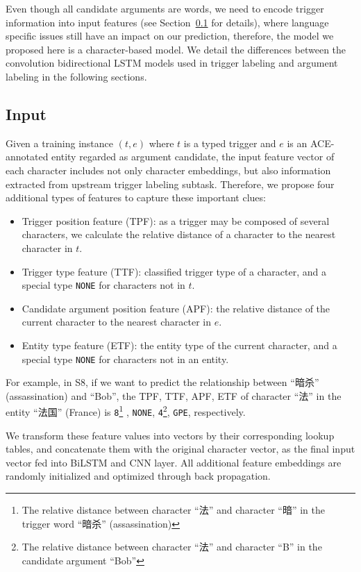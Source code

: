 Even though all candidate arguments are words, we need to encode trigger information into input features (see Section~\ref{ainput} for details), where language specific issues still have an impact on our prediction, therefore, the model we proposed here is a character-based model. We detail the differences between the convolution bidirectional LSTM models used in trigger labeling and argument labeling in the following sections.

\subsection{Input}\label{ainput}
Given a training instance $(t, e)$ where $t$ is a typed trigger and $e$ is an ACE-annotated entity regarded as argument candidate, the input feature vector of each character includes not only character embeddings, but also information extracted from upstream trigger labeling subtask. Therefore, we propose four additional types of features to capture these important clues:
\begin{itemize}
\item Trigger position feature (TPF): as a trigger may be composed of several characters, we calculate the relative distance of a character to the nearest character in $t$.
\item Trigger type feature (TTF): classified trigger type of a character, and a special type \texttt{NONE} for characters not in $t$.
\item Candidate argument position feature (APF): the relative distance of the current character to the nearest character in $e$.
\item Entity type feature (ETF): the entity type of the current character, and a special type \texttt{NONE} for characters not in an entity.
\end{itemize}

For example, in S8, if we want to predict the relationship between ``暗杀'' (assassination) and ``Bob'', the TPF, TTF, APF, ETF of character ``法'' in the entity ``法国'' (France) is \texttt{8}\footnote{The relative distance between character ``法'' and character ``暗'' in the trigger word ``暗杀'' (assassination)} , \texttt{NONE}, \texttt{4}\footnote{The relative distance between character ``法'' and character ``B'' in the candidate argument ``Bob''}, \texttt{GPE}, respectively.


We transform these feature values into vectors by their corresponding lookup tables, and concatenate them with the original character vector, as the final input vector fed into BiLSTM and CNN layer. All additional feature embeddings are randomly initialized and optimized through back propagation.

